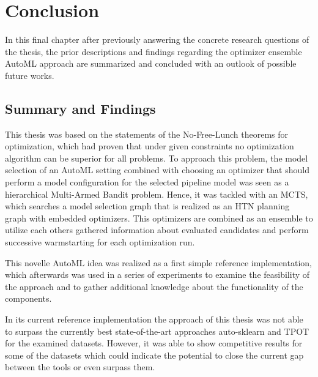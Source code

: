 %
\chapter{Conclusion}
\label{sec:conclusion}
In this final chapter after previously answering the concrete research questions of the thesis, the prior descriptions and findings regarding the optimizer ensemble AutoML approach are summarized and concluded with an outlook of possible future works.

\section{Summary and Findings}
\label{sec:conclusion:summary}
This thesis was based on the statements of the No-Free-Lunch theorems for optimization, which had proven that under given constraints no optimization algorithm can be superior for all problems.
To approach this problem, the model selection of an AutoML setting combined with choosing an optimizer that should perform a model configuration for the selected pipeline model was seen as a hierarchical Multi-Armed Bandit problem.
Hence, it was tackled with an MCTS, which searches a model selection graph that is realized as an HTN planning graph with embedded optimizers.
This optimizers are combined as an ensemble to utilize each others gathered information about evaluated candidates and perform successive warmstarting for each optimization run.

This novelle AutoML idea was realized as a first simple reference implementation, which afterwards was used in a series of experiments to examine the feasibility of the approach and to gather additional knowledge about the functionality of the components.

In its current reference implementation the approach of this thesis was not able to surpass the currently best state-of-the-art approaches auto-sklearn and TPOT for the examined datasets.
However, it was able to show competitive results for some of the datasets which could indicate the potential to close the current gap between the tools or even surpass them.

